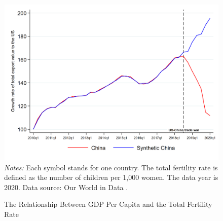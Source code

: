 \newpage
\begin{figure}[H]
	\centering
	\caption{The Relationship Between GDP Per Capita and the Total Fertility Rate}\label{fig.gdp_fertility}
	\includegraphics[width=0.8\linewidth]{figures/SCM_us_ch.png}\\
	\fontsize{10}{10pt}\selectfont
	\flushleft
	\emph{Notes:} Each symbol stands for one country. The total fertility rate is defined as the number of children per 1,000 women. The data year is 2020. Data source: Our World in Data \citep{owidfertilityrate,owidgdp}.
\end{figure}
